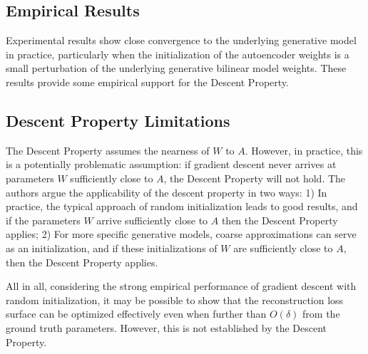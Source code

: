 \subsection{Empirical Results} 

Experimental results show close convergence to the underlying
generative model in practice, particularly when the initialization of
the autoencoder weights is a small perturbation of the underlying
generative bilinear model weights. These results provide some
empirical support for the Descent Property.

\subsection{Descent Property Limitations}

The Descent Property assumes the nearness of $W$ to $A$. However, in
practice, this is a potentially problematic assumption: if gradient
descent never arrives at parameters $W$ sufficiently close to $A$,
the Descent Property will not hold. The authors argue the
applicability of the descent property in two ways: 1) In practice,
the typical approach of random initialization leads to good results,
and if the parameters $W$ arrive sufficiently close to $A$ then the
Descent Property applies; 2) For more specific generative models,
coarse approximations can serve as an initialization, and if these
initializations of $W$ are sufficiently close to $A$, then the
Descent Property applies.

All in all, considering the strong empirical performance of gradient
descent with random initialization, it may be possible to show that
the reconstruction loss surface can be optimized effectively even
when further than $O(\delta)$ from the ground truth parameters.
However, this is not established by the Descent Property.
